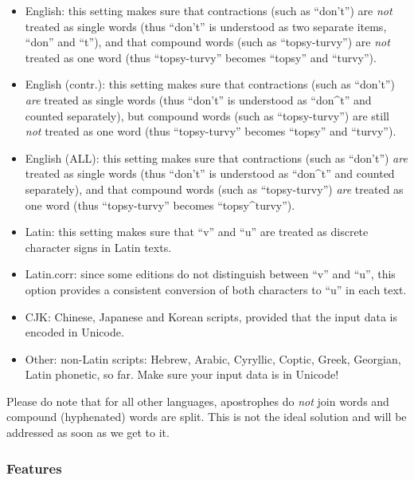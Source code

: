 \documentclass[11pt,a4paper]{article}
\def\margin#1{\marginpar{\textcolor{blue}{\footnotesize\tt #1}}}
\begin{document}
\begin{itemize}

\item English: this setting makes sure that contractions (such as “don’t”)
are \emph{not} treated as single words (thus ``don't'' is understood
as two separate items, “don” and “t”), and that compound words (such
as “topsy-turvy”) are \emph{not} treated as one word (thus “topsy-turvy”
becomes “topsy” and “turvy”).\margin{"English"} 

\item English (contr.): this setting makes sure that contractions (such as “don’t”) \emph{are} treated as single words (thus ``don't'' is understood as “don\^{ }t” and counted separately), but compound words (such as “topsy-turvy”) are still \emph{not} treated as one word (thus “topsy-turvy” becomes “topsy” and “turvy”).\margin{"English.contr"} 

\item English (ALL): this setting makes sure that contractions (such as
“don’t”) \emph{are} treated as single words (thus ``don't'' is understood
as “don\^{ }t” and counted separately), and that compound words (such
as “topsy-turvy”) \emph{are} treated as one word (thus “topsy-turvy”
becomes “topsy\^{ }turvy”).\margin{"English.all"} 

\item Latin: this setting makes sure that “v” and “u” are treated as discrete
character signs in Latin texts.\margin{"Latin"} 

\item Latin.corr: since some editions do not distinguish between “v” and
“u”, this option provides a consistent conversion of both characters
to “u” in each text.\margin{"Latin.corr"} 

\item CJK: Chinese, Japanese and Korean scripts, provided that the input
data is encoded in Unicode.\margin{"CJK"}

\item Other: non-Latin scripts: Hebrew, Arabic, Cyryllic, Coptic, Greek,
Georgian, Latin phonetic, so far.  Make sure your input data is in 
Unicode!\margin{"Other"}
\end{itemize}

Please do note that for all other languages, apostrophes do \emph{not}
join words and compound (hyphenated) words are split. This is not
the ideal solution and will be addressed as soon as we get to it.


\subsubsection{Features}
\end{document}
